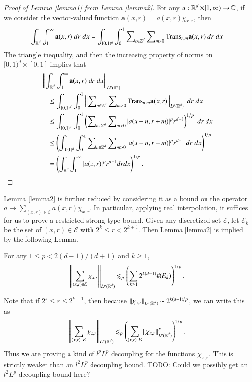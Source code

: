 \begin{proof}[Proof of Lemma \ref{lemma1} from Lemma \ref{lemma2}]
    For any $a: \operatorname{\mathbb{R}}^d \times [1,\infty) \to \operatorname{\mathbb{C}}$, if we consider the vector-valued function $\mathbf{a}(x,r) = a(x,r) \chi_{x,r}$, then
    \[ \int_{\operatorname{\mathbb{R}}^d} \int_1^\infty \mathbf{a}(x,r)\; dr\; dx = \int_{[0,1)^d} \int_0^1 \sum\nolimits_{n \in \operatorname{\mathbb{Z}}^d} \sum\nolimits_{m > 0} \text{Trans}_{n,m} \mathbf{a}(x,r)\; dr\; dx \]
    The triangle inequality, and then the increasing property of norms on $[0,1)^d \times [0,1]$ implies that
    \begin{align*}
    &\left\| \int_{\operatorname{\mathbb{R}}^d} \int_1^\infty \mathbf{a}(x,r)\; dr\; dx \right\|_{L^p(\operatorname{\mathbb{R}}^d)}\\
    &\quad \leq \int_{[0,1)^d} \int_0^1 \left\| \sum\nolimits_{n \in \operatorname{\mathbb{Z}}^d} \sum\nolimits_{m > 0} \text{Trans}_{n,m} \mathbf{a}(x,r) \right\|_{L^p(\operatorname{\mathbb{R}}^d)}\; dr\; dx\\
    &\quad \lesssim \int_{[0,1)^d} \int_0^1 \left( \sum\nolimits_{n \in \operatorname{\mathbb{Z}}^d} \sum\nolimits_{m > 0} |a(x - n, r + m)|^p r^{d-1} \right)^{1/p}\; dr\; dx\\
    &\quad \leq \left( \int_{[0,1)^d} \int_0^1 \sum\nolimits_{n \in \operatorname{\mathbb{Z}}^d} \sum\nolimits_{m > 0} |a(x - n, r + m)|^p r^{d-1}\; dr\; dx \right)^{1/p}\\
    &\quad = \left( \int_{\operatorname{\mathbb{R}}^d} \int_1^\infty |a(x,r)|^p r^{d-1} dr dx \right)^{1/p}. \qedhere
    \end{align*}
\end{proof}

Lemma \ref{lemma2} is further reduced by considering it as a bound on the operator $a \mapsto \sum_{(x,r) \in \mathcal{E}} a(x,r) \chi_{x,r}$. In particular, applying real interpolation, it suffices for us to prove a restricted strong type bound. Given any discretized set $\mathcal{E}$, let $\mathcal{E}_k$ be the set of $(x,r) \in \mathcal{E}$ with $2^k \leq r < 2^{k+1}$. Then Lemma \ref{lemma2} is implied by the following Lemma.

\begin{lemma} \label{lemma3}
    For any $1 \leq p < 2(d - 1)/(d+1)$ and $k \geq 1$,
    \[ \left\| \sum_{(x,r) \in \mathcal{E}} \chi_{x,r} \right\|_{L^p(\operatorname{\mathbb{R}}^d)} \lesssim_p \left( \sum_{k \geq 1} 2^{k(d-1)} \#(\mathcal{E}_k) \right)^{1/p}. \]
\end{lemma}

\begin{remark}
    Note that if $2^k \leq r \leq 2^{k+1}$, then because $\| \chi_{x,r} \|_{L^p(\operatorname{\mathbb{R}}^d)} \sim 2^{k(d-1)/p}$, we can write this as
    \[ \left\| \sum_{(x,r) \in \mathcal{E}} \chi_{x,r} \right\|_{L^p(\operatorname{\mathbb{R}}^d)} \lesssim_p \left( \sum_{(x,r) \in \mathcal{E}} \| \chi_{x,r} \|_{L^p(\operatorname{\mathbb{R}}^d)}^p \right)^{1/p}. \]
    Thus we are proving a kind of $l^p L^p$ decoupling for the functions $\chi_{x,r}$. This is strictly weaker than an $l^2 L^p$ decoupling bound. TODO: Could we possibly get an $l^2 L^p$ decoupling bound here?
\end{remark}

